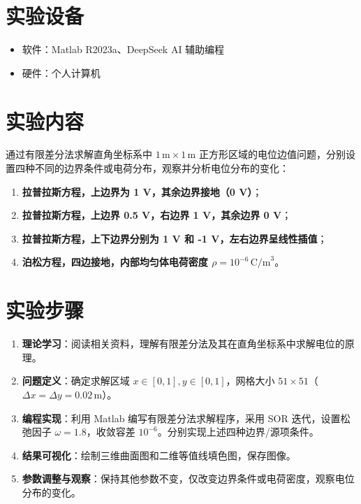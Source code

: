\documentclass{../ElectromagneticFieldTemplate}
\begin{document}
\section{实验设备}

\begin{itemize}
    \item 软件：Matlab R2023a、DeepSeek AI 辅助编程
    \item 硬件：个人计算机
\end{itemize}

\section{实验内容}

通过有限差分法求解直角坐标系中 \(1\,\text{m}\times 1\,\text{m}\) 正方形区域的电位边值问题，分别设置四种不同的边界条件或电荷分布，观察并分析电位分布的变化：

\begin{enumerate}
    \item \textbf{拉普拉斯方程，上边界为 1 V，其余边界接地（0 V）}；
    \item \textbf{拉普拉斯方程，上边界 0.5 V，右边界 1 V，其余边界 0 V}；
    \item \textbf{拉普拉斯方程，上下边界分别为 1 V 和 -1 V，左右边界呈线性插值}；
    \item \textbf{泊松方程，四边接地，内部均匀体电荷密度 \(\rho=10^{-6}\,\text{C/m}^3\)}。
\end{enumerate}

\section{实验步骤}

\begin{enumerate}
    \item \textbf{理论学习}：阅读相关资料，理解有限差分法及其在直角坐标系中求解电位的原理。
    \item \textbf{问题定义}：确定求解区域 \(x\in[0,1], y\in[0,1]\)，网格大小 \(51\times 51\)（\(\Delta x=\Delta y=0.02\,\text{m}\)）。
    \item \textbf{编程实现}：利用 Matlab 编写有限差分法求解程序，采用 SOR 迭代，设置松弛因子 \(\omega=1.8\)，收敛容差 \(10^{-6}\)。分别实现上述四种边界/源项条件。
    \item \textbf{结果可视化}：绘制三维曲面图和二维等值线填色图，保存图像。
    \item \textbf{参数调整与观察}：保持其他参数不变，仅改变边界条件或电荷密度，观察电位分布的变化。
\end{enumerate}
\end{document}

